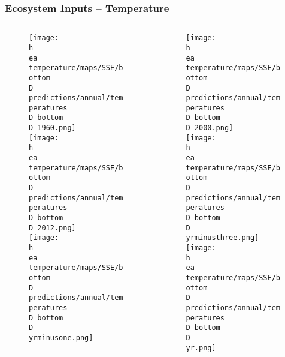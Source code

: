 \documentclass{beamer}
\numberwithin{equation}{section}		%
\numberwithin{figure}{section}	   	%
\numberwithin{table}{section}				%
\newcommand{\yr}{2017}
\newcommand{\yrminusone}{2016}
\newcommand{\yrminusthree}{2014}
\newcommand{\D}{.}  %
\newcommand{\h}{C:/} %
\newcommand{\ea}{bio.data/aegis/}
\begin{document}
\begin{frame}
\frametitle{Ecosystem Inputs -- Temperature}
\vspace*{-0.4cm}
	\begin{columns}

	\begin{column}{0.5\textwidth}
 	\begin{figure}
    \texttt{[image: \\h \\ea temperature/maps/SSE/bottom\\D predictions/annual/temperatures\\D bottom\\D  1960.png]}\\   
    \texttt{[image: \\h \\ea temperature/maps/SSE/bottom\\D predictions/annual/temperatures\\D bottom\\D  2012.png]}\\   
    \texttt{[image: \\h \\ea temperature/maps/SSE/bottom\\D predictions/annual/temperatures\\D bottom\\D  \\yrminusone.png]}\\   
  	\end{figure}
  	\end{column}

  	\begin{column}{0.5\textwidth}
 	\begin{figure}
    \texttt{[image: \\h \\ea temperature/maps/SSE/bottom\\D predictions/annual/temperatures\\D bottom\\D  2000.png]}\\   
    \texttt{[image: \\h \\ea temperature/maps/SSE/bottom\\D predictions/annual/temperatures\\D bottom\\D  \\yrminusthree.png]}\\   
    \texttt{[image: \\h \\ea temperature/maps/SSE/bottom\\D predictions/annual/temperatures\\D bottom\\D  \\yr.png]}\\   
  	\end{figure}
  	\end{column}

 	\end{columns}
\end{frame}
\end{document}
